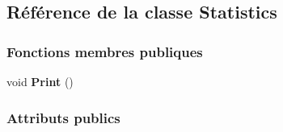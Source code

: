 \hypertarget{class_statistics}{}\subsection{Référence de la classe Statistics}
\label{class_statistics}
\subsubsection*{Fonctions membres publiques}
\begin{DoxyCompactItemize}
\item 
\hypertarget{class_statistics_ade67669fb1436e69a215a780b1ade63e}{}\label{class_statistics_ade67669fb1436e69a215a780b1ade63e} 
void {\bfseries Print} ()
\end{DoxyCompactItemize}
\subsubsection*{Attributs publics}

